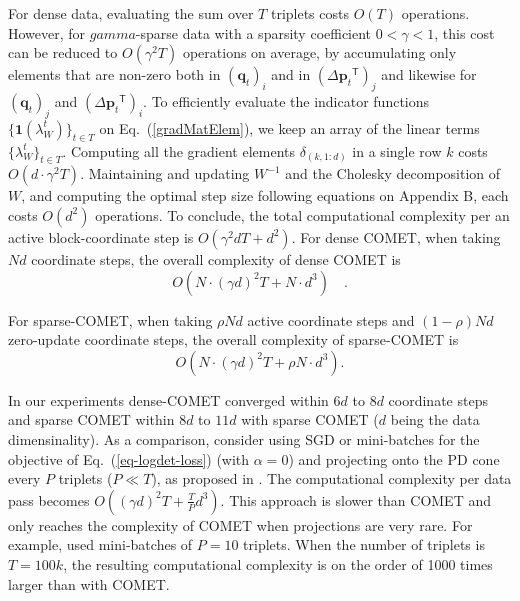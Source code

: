 \documentclass[twoside,11pt]{article}
\newcommand\mat[1]{{#1}}
\renewcommand\vec[1]{\mathbf{#1}}
\newcommand{\T}{{}^\mathsf{T}}
\newcommand{\W}{\mat{W}}
\renewcommand{\eqref}[1]{Eq.~(\ref{#1})}
\begin{document}
For dense data, evaluating the sum over $T$ triplets costs $O(T)$ operations. However, for $gamma$-sparse data with a sparsity coefficient $ 0< \gamma <1 $, this cost can be reduced to $O(\gamma^2 T)$ operations on average, by accumulating only elements that are non-zero both in $(\vec{q}_{t})_i$ and in $(\Delta\vec{p}_{t}\T)_j$ and likewise for $(\vec{q}_{t})_j$ and $(\Delta\vec{p}_{t}\T)_i$.  To efficiently evaluate the indicator functions $\{ \textbf{1}(\lambda_{W}^t) \}_{t \in T}$ on \eqref{gradMatElem}, we keep an array of the linear terms $\{\lambda_{W}^t\}_{t \in T}$. Computing all the gradient elements $\delta_{(k,1:d)}$ in a single row $k$ costs $O(d\cdot \gamma^2 T)$.
Maintaining and updating $\W^{-1}$ and the Cholesky decomposition of $\W$, and computing the optimal step size following equations on Appendix B, each costs $O(d^2)$ operations. To conclude, the total computational complexity per an active block-coordinate step is $O(\gamma^2 d T + d^2)$. 
For dense COMET, when taking $Nd$ coordinate steps, the overall complexity of dense COMET is 
\begin{equation}
    O(N \cdot (\gamma d)^2 T + N \cdot d^3) \quad.
    \label{cometComplexity}
\end{equation}

For sparse-COMET, when taking $\rho N d$ active coordinate steps and $(1-\rho) Nd$ zero-update coordinate steps, the overall complexity of sparse-COMET is
\begin{equation}
     O(N \cdot (\gamma d)^2 T + \rho N \cdot d^3).
     \label{spcometComplexity}
\end{equation}

In our experiments dense-COMET converged within $6 d$ to $8 d$ coordinate steps and sparse COMET within $8 d$ to $11 d$ with sparse COMET ($d$ being the data dimensinality). As a comparison, consider using SGD or mini-batches for the objective of \eqref{eq-logdet-loss} (with $\alpha = 0$) and projecting onto the PD cone every $P$ triplets ($P \ll T$), as proposed in \citet{OASIS,qian}. The computational complexity per data pass becomes $O((\gamma d)^2 T + \frac{T}{P} d^3)$. This approach is slower than COMET and only reaches the complexity of COMET when projections are very rare. For example, \citet{qian} used mini-batches of $P=10$ triplets. When the number of triplets is $T=100k$, the resulting computational complexity is on the order of 1000 times larger than with COMET.
\end{document}
